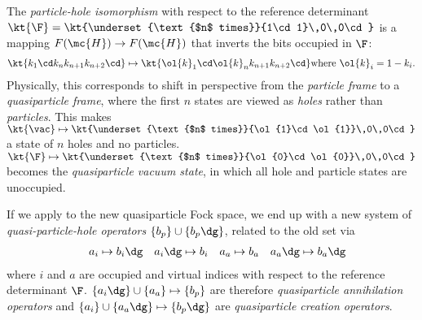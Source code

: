 \begin{dfn}\label{dfn:particle-hole-isomorphism}
The \textit{particle-hole isomorphism} with respect to the reference determinant $\kt{\F}=\kt{\underset{\text{$n$ times}}{1\cd1}\,0\,0\cd}$ is a mapping $F(\mc{H})\rightarrow F(\mc{H})$ that inverts the bits occupied in $\F$:
\begin{align*}
  \kt{k_1\cd k_nk_{n+1}k_{n+2}\cd}
\mapsto
  \kt{\ol{k}_1\cd \ol{k}_nk_{n+1}k_{n+2}\cd}
  \text{where $\ol{k}_i=1-k_i$.}
\end{align*}
Physically, this corresponds to shift in perspective from the \textit{particle frame} to a \textit{quasiparticle frame}, where the first $n$ states are viewed as \textit{holes} rather than \textit{particles}.
This makes $\kt{\vac}\mapsto\kt{\underset{\text{$n$ times}}{\ol{1}\cd\ol{1}}\,0\,0\cd}$ a state of $n$ holes and no particles.  $\kt{\F}\mapsto\kt{\underset{\text{$n$ times}}{\ol{0}\cd\ol{0}}\,0\,0\cd}$ becomes the \textit{quasiparticle vacuum state}, in which all hole and particle states are unoccupied.
\end{dfn}

\begin{dfn}
If we apply  to the new quasiparticle Fock space, we end up with a new system of \textit{quasi-particle-hole operators} $\{b_p\}\cup\{b_p\dg\}$, related to the old set via
\begin{align}
&&
  a_i
\mapsto
  b_i\dg
&&
  a_i\dg
\mapsto
  b_i
&&
  a_a
\mapsto
  b_a
&&
  a_a\dg
\mapsto
  b_a\dg
\end{align}
where $i$ and $a$ are occupied and virtual indices with respect to the reference determinant $\F$.
$\{a_i\dg\}\cup\{a_a\}\mapsto\{b_p\}$ are therefore \textit{quasiparticle annihilation operators} and $\{a_i\}\cup\{a_a\dg\}\mapsto\{b_p\dg\}$ are \textit{quasiparticle creation operators}.
\end{dfn}

